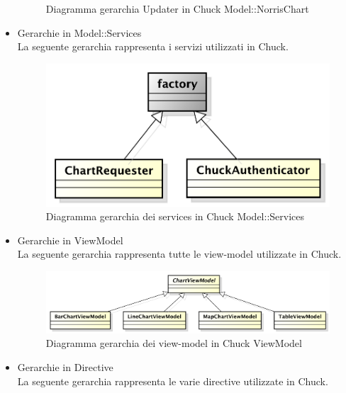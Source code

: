 \begin{itemize}
\begin{figure}[H]
                        \caption{Diagramma gerarchia Updater in Chuck Model::NorrisChart }
                    \end{figure}
                \item Gerarchie in Model::Services \\
                    La seguente gerarchia rappresenta i servizi utilizzati in Chuck.
                    \begin{figure}[H]
                        \centering
                        \includegraphics{DefinizioneDiProdotto/Pics/Gerarchie/ChuckService.pdf}
                        \caption{Diagramma gerarchia dei services in Chuck Model::Services}
                    \end{figure}
                \item Gerarchie in ViewModel \\
                    La seguente gerarchia rappresenta tutte le view-model utilizzate in Chuck.
                    \begin{figure}[H]
                        \centering
                        \includegraphics{DefinizioneDiProdotto/Pics/Gerarchie/ChuckViewModel.pdf}
                        \caption{Diagramma gerarchia dei view-model in Chuck ViewModel}
                    \end{figure}
                \item Gerarchie in Directive \\
                    La seguente gerarchia rappresenta le varie directive utilizzate in Chuck.
                    \begin{figure}[H]

\end{figure}
\end{itemize}
